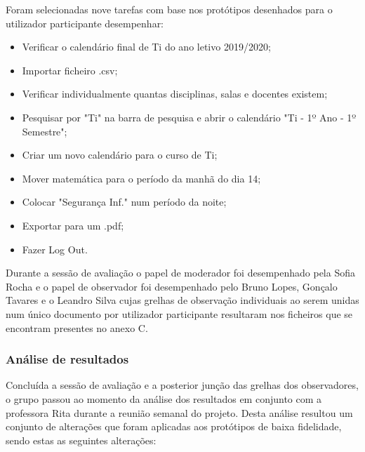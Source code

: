 \documentclass[11pt, twoside]{report}
\begin{document}
Foram selecionadas nove tarefas com base nos protótipos desenhados para o utilizador participante desempenhar:

\begin{itemize}
	\item Verificar o calendário final de Ti do ano letivo 2019/2020;
	\item Importar ficheiro .csv;
	\item Verificar individualmente quantas disciplinas, salas e docentes existem;
	\item Pesquisar por "Ti" na barra de pesquisa e abrir o calendário "Ti - 1º Ano - 1º Semestre";
	\item Criar um novo calendário para o curso de Ti;
	\item Mover matemática para o período da manhã do dia 14;
	\item Colocar "Segurança Inf." num período da noite;
	\item Exportar para um .pdf;
	\item Fazer Log Out.
\end{itemize}


Durante a sessão de avaliação o papel de moderador foi desempenhado pela Sofia Rocha e o papel de observador foi desempenhado pelo Bruno Lopes, Gonçalo Tavares e o Leandro Silva cujas grelhas de observação individuais ao serem unidas num único documento por utilizador participante resultaram nos ficheiros que se encontram presentes no anexo C.

	

	\subsubsection{Análise de resultados}
Concluída a sessão de avaliação e a posterior junção das grelhas dos observadores, o grupo passou ao momento da análise dos resultados em conjunto com a professora Rita durante a reunião semanal do projeto. Desta análise resultou um conjunto de alterações que foram aplicadas aos protótipos de baixa fidelidade, sendo estas as seguintes alterações:
\end{document}
